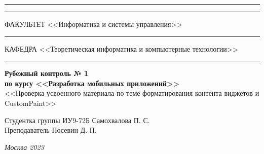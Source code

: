 \documentclass[a4paper, 14pt]{extarticle}
\begin{document}
\begin{titlepage}
\vspace{-25pt}
\hspace{-35pt}\rule{\textwidth}{2.3pt}

\vspace*{-20.3pt}
\hspace{-35pt}\rule{\textwidth}{0.4pt}

\vspace{1.5ex}
\hspace{-35pt} \noindent \small ФАКУЛЬТЕТ\hspace{80pt} <<Информатика и системы управления>>

\vspace*{-16pt}
\hspace{47pt}\rule{0.83\textwidth}{0.4pt}

\vspace{0.5ex}
\hspace{-35pt} \noindent \small КАФЕДРА\hspace{50pt} <<Теоретическая информатика и компьютерные технологии>>

\vspace*{-16pt}
\hspace{30pt}\rule{0.866\textwidth}{0.4pt}
  
\vspace{11em}

\begin{center}
\Large {\bf Рубежный контроль № 1} \\
\large {\bf по курсу <<Разработка мобильных приложений>>} \\
\large <<Проверка усвоенного материала по теме форматирования контента виджетов и CustomPaint>>
\end{center}\normalsize

\vspace{8em}


\begin{flushright}
  {Студентка группы ИУ9-72Б Самохвалова П. С. \hspace*{15pt}\\
  \vspace{2ex}
  Преподаватель Посевин Д. П.\hspace*{15pt}}
\end{flushright}

\bigskip

\vfill
 

\begin{center}
\textsl{Москва 2023}
\end{center}
\end{titlepage}
\end{document}
